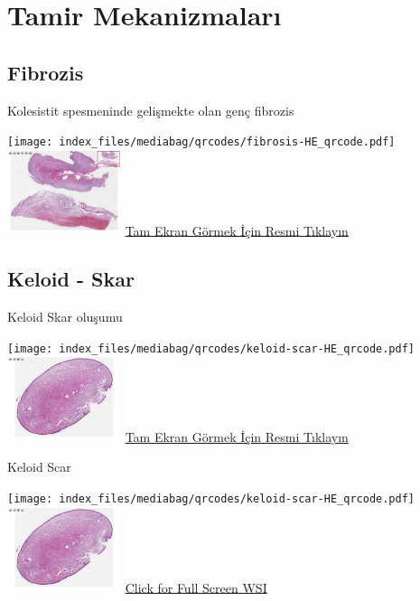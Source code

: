 \documentclass[
  letterpaper,
  DIV=11,
  numbers=noendperiod]{scrreprt}
\begin{document}
\hypertarget{sec-tamir-mekanizmalari}{%
\chapter{Tamir Mekanizmaları}\label{sec-tamir-mekanizmalari}}

\hypertarget{sec-fibrozis}{%
\section{Fibrozis}\label{sec-fibrozis}}

Kolesistit spesmeninde gelişmekte olan genç fibrozis

\texttt{[image: index\_files/mediabag/qrcodes/fibrosis-HE\_qrcode.pdf]}
\href{https://images.patolojiatlasi.com/fibrosis/HE.html}{\includegraphics[width=0.25\textwidth,height=\textheight]{./screenshots/thumbnail_fibrosis.png}}
\href{https://images.patolojiatlasi.com/fibrosis/HE.html}{Tam Ekran
Görmek İçin Resmi Tıklayın}

\hypertarget{sec-keloid-skar}{%
\section{Keloid - Skar}\label{sec-keloid-skar}}

Keloid Skar oluşumu

\texttt{[image: index\_files/mediabag/qrcodes/keloid-scar-HE\_qrcode.pdf]}
\href{https://images.patolojiatlasi.com/keloid-scar/HE.html}{\includegraphics[width=0.25\textwidth,height=\textheight]{./screenshots/thumbnail_keloid-scar.png}}
\href{https://images.patolojiatlasi.com/keloid-scar/HE.html}{Tam Ekran
Görmek İçin Resmi Tıklayın}

Keloid Scar

\texttt{[image: index\_files/mediabag/qrcodes/keloid-scar-HE\_qrcode.pdf]}
\href{https://images.patolojiatlasi.com/keloid-scar/HE.html}{\includegraphics[width=0.25\textwidth,height=\textheight]{./screenshots/thumbnail_keloid-scar.png}}
\href{https://images.patolojiatlasi.com/keloid-scar/HE.html}{Click for
Full Screen WSI}
\end{document}
